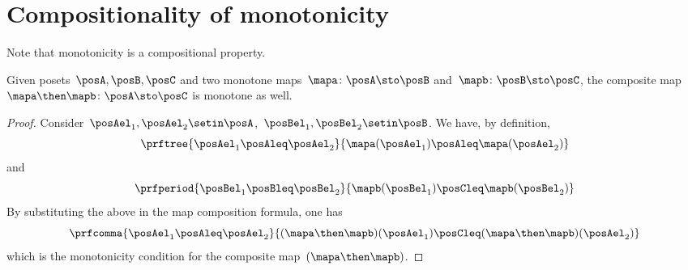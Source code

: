 
\section{Compositionality of monotonicity}
Note that monotonicity is a compositional property.
\begin{lemma}
    Given posets~$\posA,\posB,\posC$ and two monotone maps~$\mapa\colon \posA \sto \posB$ and~$\mapb\colon \posB \sto \posC$, the composite map~$\mapa\then \mapb\colon \posA \sto \posC$ is monotone as well.
\end{lemma}
\begin{proof}
    Consider~$\posAel_1,\posAel_2 \setin \posA$,~$\posBel_1,\posBel_2\setin \posB$.
    We have, by definition,
    \begin{equation*}
        \prftree{\posAel_1\posAleq \posAel_2}{\mapa(\posAel_1)\posAleq \mapa(\posAel_2)}
    \end{equation*}
    and
    \begin{equation*}
        \prfperiod{\posBel_1\posBleq \posBel_2}{\mapb(\posBel_1)\posCleq \mapb(\posBel_2)}
    \end{equation*}
    By substituting the above in the map composition formula, one has
    \begin{equation*}
        \prfcomma{\posAel_1\posAleq \posAel_2 }{ (\mapa\then \mapb)(\posAel_1) \posCleq (\mapa\then \mapb)(\posAel_2)}
    \end{equation*}
    which is the monotonicity condition for the composite map~$(\mapa\then \mapb)$.
\end{proof}
